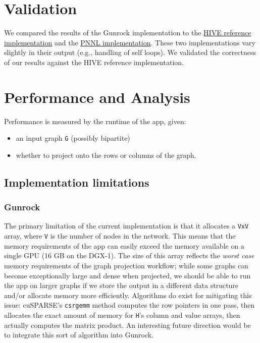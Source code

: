 \documentclass[10pt,oneside]{memoir}
\providecommand{\tightlist}{%
  \setlength{\itemsep}{0pt}\setlength{\parskip}{0pt}}
\begin{document}
\hypertarget{validation-1}{%
\section{Validation}\label{validation-1}}

We compared the results of the Gunrock implementation to the
\href{https://hiveprogram.com/wiki/display/WOR/V0+-+Application+Classification}{HIVE
reference implementation} and the
\href{https://gitlab.hiveprogram.com/jfiroz/graph_projection}{PNNL
implementation}. These two implementations vary slightly in their output
(e.g., handling of self loops). We validated the correctness of our
results against the HIVE reference implementation.

\hypertarget{performance-and-analysis-6}{%
\section{Performance and Analysis}\label{performance-and-analysis-6}}

Performance is measured by the runtime of the app, given:

\begin{itemize}
\tightlist
\item
  an input graph \texttt{G} (possibly bipartite)
\item
  whether to project onto the rows or columns of the graph.
\end{itemize}

\hypertarget{implementation-limitations-6}{%
\subsection{Implementation
limitations}\label{implementation-limitations-6}}

\hypertarget{gunrock-2}{%
\subsubsection{Gunrock}\label{gunrock-2}}

The primary limitation of the current implementation is that it
allocates a \texttt{\textbar{}V\textbar{}x\textbar{}V\textbar{}} array,
where \texttt{\textbar{}V\textbar{}} is the number of nodes in the
network. This means that the memory requirements of the app can easily
exceed the memory available on a single GPU (16 GB on the DGX-1). The
size of this array reflects the \emph{worst case} memory requirements of
the graph projection workflow; while some graphs can become
exceptionally large and dense when projected, we should be able to run
the app on larger graphs if we store the output in a different data
structure and/or allocate memory more efficiently. Algorithms do exist
for mitigating this issue: cuSPARSE's \texttt{csrgemm} method computes
the row pointers in one pass, then allocates the exact amount of memory
for \texttt{H}'s column and value arrays, then actually computes the
matrix product. An interesting future direction would be to integrate
this sort of algorithm into Gunrock.
\end{document}
